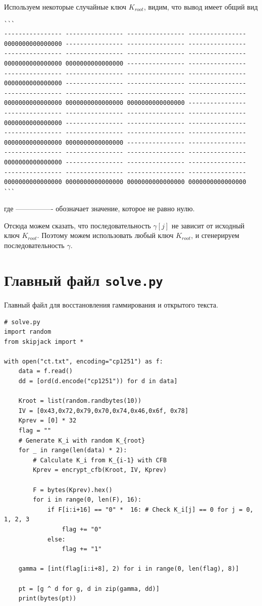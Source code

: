 \documentclass{article}
\begin{document}
Используем некоторые случайные ключ $K_{root}$, видим, что вывод имеет общий вид

\begin{verbatim}
```
---------------- ---------------- ---------------- ----------------
0000000000000000 ---------------- ---------------- ----------------
---------------- ---------------- ---------------- ----------------
0000000000000000 0000000000000000 ---------------- ----------------
---------------- ---------------- ---------------- ----------------
0000000000000000 ---------------- ---------------- ----------------
---------------- ---------------- ---------------- ----------------
0000000000000000 0000000000000000 0000000000000000 ----------------
---------------- ---------------- ---------------- ----------------
0000000000000000 ---------------- ---------------- ----------------
---------------- ---------------- ---------------- ----------------
0000000000000000 0000000000000000 ---------------- ----------------
---------------- ---------------- ---------------- ----------------
0000000000000000 ---------------- ---------------- ----------------
---------------- ---------------- ---------------- ----------------
0000000000000000 0000000000000000 0000000000000000 0000000000000000
```
\end{verbatim}

\noindent где ---------------- обозначает значение, которое не равно нулю.

Отсюда можем сказать, что последовательность $\gamma[j]$ не зависит от исходный ключ $K_{root}$. Поэтому можем использовать любый ключ $K_{root}$, и сгенерируем последовательность $\gamma$.
    

\section{Главный файл \texttt{solve.py}}

Главный файл для восстановления гаммирования и открытого текста.

\begin{verbatim}
# solve.py
import random
from skipjack import *

with open("ct.txt", encoding="cp1251") as f:
    data = f.read()
    dd = [ord(d.encode("cp1251")) for d in data]

    Kroot = list(random.randbytes(10))
    IV = [0x43,0x72,0x79,0x70,0x74,0x46,0x6f, 0x78]
    Kprev = [0] * 32
    flag = ""
    # Generate K_i with random K_{root}
    for _ in range(len(data) * 2):
        # Calculate K_i from K_{i-1} with CFB
        Kprev = encrypt_cfb(Kroot, IV, Kprev)

        F = bytes(Kprev).hex()
        for i in range(0, len(F), 16):
            if F[i:i+16] == "0" *  16: # Check K_i[j] == 0 for j = 0, 1, 2, 3
                flag += "0"
            else:
                flag += "1"

    gamma = [int(flag[i:i+8], 2) for i in range(0, len(flag), 8)]

    pt = [g ^ d for g, d in zip(gamma, dd)]
    print(bytes(pt))
\end{verbatim}
\end{document}
